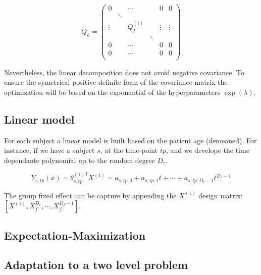 \documentclass[final, paper=letter,5p,times,twocolumn]{elsarticle}
\theoremstyle{definition}
\begin{document}
\begin{equation}
  Q_{k} =
  \left (
  \begin{array}{cccccc}
    0 &  &\cdots&& 0 & 0 \\
      & \ddots &  &&  &  \\
    \vdots &  & Q_{j}^{(i)} && \vdots & \vdots \\
      &        &  &\ddots&  &  \\
    0 &  &\cdots&& 0 & 0 \\
    0 &  &\cdots&& 0 & 0 \\
  \end{array}
    \right )
  \label{Covariance_base_matrix}
\end{equation}

Nevertheless, the linear decomposition does not avoid negative covariance. To ensure the symetrical positive definite form of the covariance matrix the optimization will be based on the exponantial of the hyperparameters $\exp(\lambda)$.

\subsection{Linear model}

For each subject a linear model is built based on the patient age (demeaned). For instance, if we have a subject $s$, at the time-point $tp$, and we develope the time dependante polynomial up to the random degree $D_{r}$.

$$
Y_{s,tp}(x) = \theta_{s,tp}^{(1)T} X^{(1)} =  a_{s,tp,0} + a_{s,tp,1} t + \cdots + a_{s,tp,D_{r} - 1}t^{D_{r} - 1}
$$

The group fixed effect can be capture by appending the $X^{(1)}$ design matrix: $[X^{(1)}, X_{f}^{D_{r}}, \cdots, X_{f}^{D_{f} - 1}]$.
\subsection{Expectation-Maximization}

\subsection{Adaptation to a two level problem}
\end{document}
